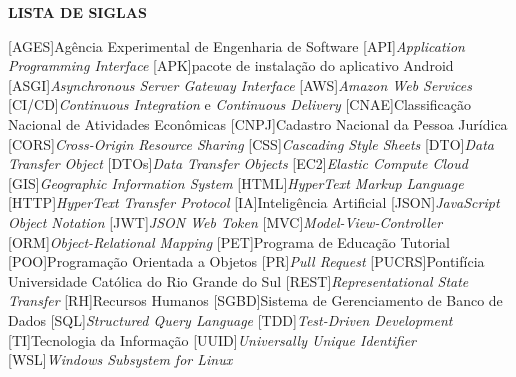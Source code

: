 \begin{center}
  \uppercase{\bfseries lista de siglas}\\[3em]
\end{center}

\begin{SingleSpace}
\small
\begin{acronym}[XXXXXXXX]
  \setlength{\itemsep}{0pt}
  \setlength{\parsep}{0pt}
  [AGES]{Agência Experimental de Engenharia de Software}
  [API]{\textit{Application Programming Interface}}
  [APK]{pacote de instalação do aplicativo Android}
  [ASGI]{\textit{Asynchronous Server Gateway Interface}}
  [AWS]{\textit{Amazon Web Services}}
  [CI/CD]{\textit{Continuous Integration} e \textit{Continuous Delivery}}
  [CNAE]{Classificação Nacional de Atividades Econômicas}
  [CNPJ]{Cadastro Nacional da Pessoa Jurídica}
  [CORS]{\textit{Cross-Origin Resource Sharing}}
  [CSS]{\textit{Cascading Style Sheets}}
  [DTO]{\textit{Data Transfer Object}}
  [DTOs]{\textit{Data Transfer Objects}}
  [EC2]{\textit{Elastic Compute Cloud}}
  [GIS]{\textit{Geographic Information System}}
  [HTML]{\textit{HyperText Markup Language}}
  [HTTP]{\textit{HyperText Transfer Protocol}}
  [IA]{Inteligência Artificial}
  [JSON]{\textit{JavaScript Object Notation}}
  [JWT]{\textit{JSON Web Token}}
  [MVC]{\textit{Model-View-Controller}}
  [ORM]{\textit{Object-Relational Mapping}}
  [PET]{Programa de Educação Tutorial}
  [POO]{Programação Orientada a Objetos}
  [PR]{\textit{Pull Request}}
  [PUCRS]{Pontifícia Universidade Católica do Rio Grande do Sul}
  [REST]{\textit{Representational State Transfer}}
  [RH]{Recursos Humanos}
  [SGBD]{Sistema de Gerenciamento de Banco de Dados}
  [SQL]{\textit{Structured Query Language}}
  [TDD]{\textit{Test-Driven Development}}
  [TI]{Tecnologia da Informação}
  [UUID]{\textit{Universally Unique Identifier}}
  [WSL]{\textit{Windows Subsystem for Linux}}
\end{acronym}
\end{SingleSpace}
